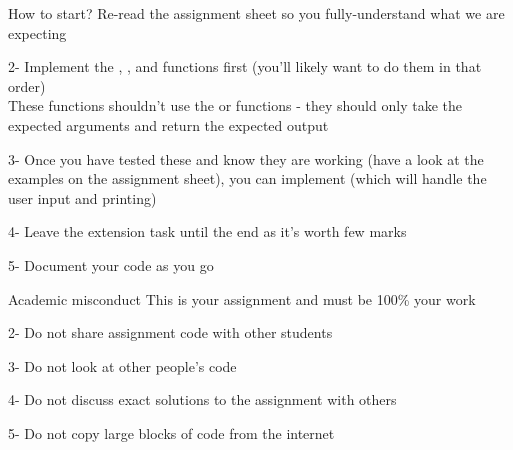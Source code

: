 \documentclass[week3]{csse1001}
\begin{document}
\begin{topic}{How to start?}
Re-read the assignment sheet so you fully-understand what we are expecting

\begin{subtopic}{2-}
Implement the , , and  functions first (you'll likely want to do them in that order)\\
These functions shouldn't use the  or  functions - they should only take the expected arguments and return the expected output
\end{subtopic}

\begin{subtopic}{3-}
Once you have tested these and know they are working (have a look at the examples on the assignment sheet), you can implement  (which will handle the user input and printing)
\end{subtopic}

\begin{subtopic}{4-}
Leave the extension task until the end as it's worth few marks
\end{subtopic}

\begin{subtopic}{5-}
Document your code as you go
\end{subtopic}

\end{topic}

\begin{topic}{Academic misconduct}
This is your assignment and must be 100\% your work

\begin{subtopic}{2-}
Do not share assignment code with other students
\end{subtopic}

\begin{subtopic}{3-}
Do not look at other people's code
\end{subtopic}

\begin{subtopic}{4-}
Do not discuss exact solutions to the assignment with others
\end{subtopic}

\begin{subtopic}{5-}
Do not copy large blocks of code from the internet
\end{subtopic}

\end{topic}
\end{document}
